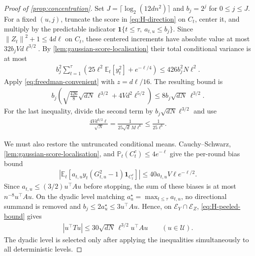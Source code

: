 \documentclass[11pt]{article}
\newcommand{\E}{\mathbb E}
\newcommand{\Pp}{\mathbb P}
\newcommand{\1}{\mathbf 1}
\newcommand{\norm}[1]{\left\lVert #1\right\rVert}
\begin{document}
\begin{proof}[Proof of \cref{prop:concentration}]
    Set $J=\lceil\log_2(12dn^2)\rceil$ and $b_j=2^j$ for
    $0\leq j\leq J$. For a fixed $(u,j)$, truncate the score in
    \eqref{eq:H-direction} on $C_t$, center it, and multiply by
    the predictable indicator
    $\1\{t\leq\tau,\ a_{t,u}\leq b_j\}$.
    Since $\norm{Z_t}^2+1\leq4d\ell$ on $C_t$, these centered increments
    have absolute value at most $32b_jVd\ell^{3/2}$.
    By \cref{lem:gaussian-score-localisation} their total conditional
    variance is at most
    \begin{align}
        b_j^2\sum_{t=1}^\tau
        \left(25\ell^2\E_t[y_t^2]+e^{-\ell/4}\right)
        \leq426b_j^2N\ell^2.
        \label{eq:H-directional-predictable}
    \end{align}
    Apply \eqref{eq:freedman-convenient} with $z=d\ell/16$. The resulting
    bound is
    \begin{align}
        b_j\left(
        \sqrt{\frac{426}{8}}\sqrt{dN}\,\ell^{3/2}
        +4Vd^2\ell^{5/2}\right)
        \leq8b_j\sqrt{dN}\,\ell^{3/2}.
        \label{eq:H-peeled-bound}
    \end{align}
    For the last inequality, divide the second term by
    $b_j\sqrt{dN}\ell^{3/2}$ and use
    \begin{align}
        \frac{4Vd^{3/2}\ell}{\sqrt N}
        =\frac{1}{25\sqrt d\,M\ell^6}
        \leq\frac{1}{25\ell^6}.
    \end{align}

    We must also restore the untruncated conditional means.
    Cauchy--Schwarz, \cref{lem:gaussian-score-localisation}, and
    $\Pp_t(C_t^c)\leq4e^{-\ell}$ give the per-round bias bound
    \begin{align}
        \left|\E_t[a_{t,u}y_t(G_{t,u}^2-1)\1_{C_t^c}]\right|
        \leq40a_{t,u}V\ell e^{-\ell/2}.
    \end{align}
    Since $a_{t,u}\leq(3/2)u^\top Au$ before stopping, the sum of these
    biases is at most $n^{-8}u^\top Au$.
    On the dyadic level matching $a_u^\star=\max_{t\leq\tau}a_{t,u}$,
    no directional summand is removed and
    $b_j\leq2a_u^\star\leq3u^\top Au$. Hence, on
    $\mathcal E_Y\cap\mathcal E_Z$, \eqref{eq:H-peeled-bound} gives
    \begin{align}
        |u^\top Tu|
        \leq30\sqrt{dN}\,\ell^{3/2}u^\top Au
        \qquad(u\in\mathcal U).
        \label{eq:H-net}
    \end{align}
    The dyadic level is selected only after applying the inequalities
    simultaneously to all deterministic levels.


\end{proof}
\end{document}
